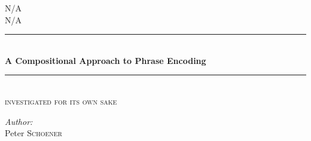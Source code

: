 \documentclass[a4paper, 12pt]{article}
\begin{document}
%
%
%
%
\begin{titlepage}

\newcommand{\HRule}{\rule{\linewidth}{0.5mm}} %

\center %
 

\textsc{\LARGE N/A}\\ %
\textsc{\Large N/A}\\[1.5cm]



\HRule \\[0.4cm]
{ \huge \bfseries A Compositional Approach to Phrase Encoding}\\[0.4cm] %
\HRule \\[1.0cm]
\textsc{\Large investigated for its own sake}\\[0.5cm]

\begin{minipage}{0.4\textwidth}
\begin{flushleft} \large
\emph{Author:}\\
Peter \textsc{Schoener} %
\end{flushleft}
\end{minipage}
~



\end{titlepage}
\end{document}
